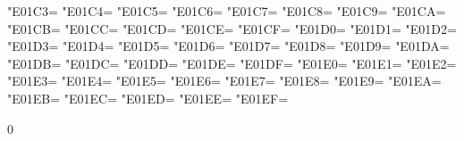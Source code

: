 \XeTeXcharclass"E01C3=\KclassCM
\XeTeXcharclass"E01C4=\KclassCM
\XeTeXcharclass"E01C5=\KclassCM
\XeTeXcharclass"E01C6=\KclassCM
\XeTeXcharclass"E01C7=\KclassCM
\XeTeXcharclass"E01C8=\KclassCM
\XeTeXcharclass"E01C9=\KclassCM
\XeTeXcharclass"E01CA=\KclassCM
\XeTeXcharclass"E01CB=\KclassCM
\XeTeXcharclass"E01CC=\KclassCM
\XeTeXcharclass"E01CD=\KclassCM
\XeTeXcharclass"E01CE=\KclassCM
\XeTeXcharclass"E01CF=\KclassCM
\XeTeXcharclass"E01D0=\KclassCM
\XeTeXcharclass"E01D1=\KclassCM
\XeTeXcharclass"E01D2=\KclassCM
\XeTeXcharclass"E01D3=\KclassCM
\XeTeXcharclass"E01D4=\KclassCM
\XeTeXcharclass"E01D5=\KclassCM
\XeTeXcharclass"E01D6=\KclassCM
\XeTeXcharclass"E01D7=\KclassCM
\XeTeXcharclass"E01D8=\KclassCM
\XeTeXcharclass"E01D9=\KclassCM
\XeTeXcharclass"E01DA=\KclassCM
\XeTeXcharclass"E01DB=\KclassCM
\XeTeXcharclass"E01DC=\KclassCM
\XeTeXcharclass"E01DD=\KclassCM
\XeTeXcharclass"E01DE=\KclassCM
\XeTeXcharclass"E01DF=\KclassCM
\XeTeXcharclass"E01E0=\KclassCM
\XeTeXcharclass"E01E1=\KclassCM
\XeTeXcharclass"E01E2=\KclassCM
\XeTeXcharclass"E01E3=\KclassCM
\XeTeXcharclass"E01E4=\KclassCM
\XeTeXcharclass"E01E5=\KclassCM
\XeTeXcharclass"E01E6=\KclassCM
\XeTeXcharclass"E01E7=\KclassCM
\XeTeXcharclass"E01E8=\KclassCM
\XeTeXcharclass"E01E9=\KclassCM
\XeTeXcharclass"E01EA=\KclassCM
\XeTeXcharclass"E01EB=\KclassCM
\XeTeXcharclass"E01EC=\KclassCM
\XeTeXcharclass"E01ED=\KclassCM
\XeTeXcharclass"E01EE=\KclassCM
\XeTeXcharclass"E01EF=\KclassCM

 0{\intercharspace}
\XeTeXinterchartoks {}
